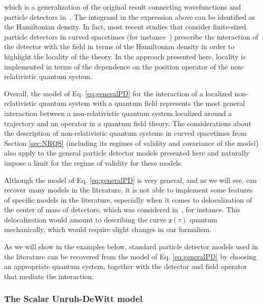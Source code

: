 \documentclass[letterpaper,12pt,titlepage,oneside,final]{book}
\newcommand{\mf}{\mathsf}%
\begin{document}
which is a generalization of the original result connecting wavefunctions and particle detectors in~\cite{Unruh-Wald}. The integrand in the expression above can be identified as the Hamiltonian density. In fact, most recent studies that consider finite-sized particle detectors in curved spacetimes (for instance~\cite{us,us2,PipoFTL,antiparticles,mine,ericksonBH,carol,geometry,ahmed,ericksonKen}) prescribe the interaction of the detector with the field in terms of the Hamiltonian density in order to highlight the locality of the theory. In the approach presented here, locality is implemented in terms of the dependence on the position operator of the non-relativistic quantum system.

Overall, the model of Eq. \eqref{eq:generalPD} for the interaction of a localized non-relativistic quantum system with a quantum field represents the most general interaction between a non-relativistic quantum system localized around a trajectory and an operator in a quantum field theory. The considerations about the description of non-relativistic quantum systems in curved spacetimes from Section \ref{sec:NRQS} (including its regimes of validity and covariance of the model) also apply to the general particle detector models presented here and naturally impose a limit for the regime of validity for these models. 

Although the model of Eq. \eqref{eq:generalPD} is very general, and as we will see, can recover many models in the literature, it is not able to implement some features of specific models in the literature, especially when it comes to delocalization of the center of mass of detectors, which was considered in~\cite{achimDelocalized,achimDelocalizedHarvesting}, for instance. This delocalization would amount to describing the curve $\mf z(\tau)$ quantum mechanically, which would require slight changes in our formalism. 


As we will show in the examples below, standard particle detector models used in the literature can be recovered from the model of Eq. \eqref{eq:generalPD} by choosing an appropriate quantum system, together with the detector and field operator that mediate the interaction. 


\subsubsection{The Scalar Unruh-DeWitt model} 
\end{document}
